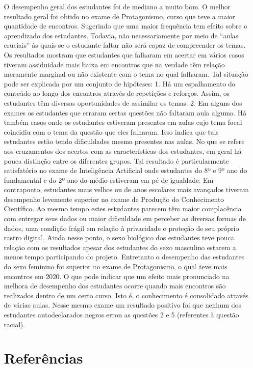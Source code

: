 \documentclass[
]{book}
\begin{document}
O desempenho geral dos estudantes foi de mediano a muito bom. O melhor resultado geral foi obtido no exame de Protagonismo, curso que teve a maior quantidade de encontros. Sugerindo que uma maior frequência tem efeito sobre o aprendizado dos estudantes. Todavia, não necessariamente por meio de ``aulas cruciais'' às quais se o estudante faltar não será capaz de compreender os temas.
Os resultados mostram que estudantes que falharam em acertar em vários casos tiveram assiduidade mais baixa em encontros que na verdade têm relação meramente marginal ou não existente com o tema no qual falharam. Tal situação pode ser explicada por um conjunto de hipóteses: 1. Há um espalhamento do conteúdo ao longo dos encontros através de repetições e reforços. Assim, os estudantes têm diversas oportunidades de assimilar os temas. 2. Em alguns dos exames os estudantes que erraram certas questões não faltaram aula alguma. Há também casos onde os estudantes estiveram presentes em aulas cujo tema focal coincidiu com o tema da questão que eles falharam. Isso indica que tais estudantes estão tendo dificuldades mesmo presentes nas aulas.
No que se refere aos cruzamentos dos acertos com as características dos estudantes, em geral há pouca distinção entre os diferentes grupos. Tal resultado é particularmente satisfatório no exame de Inteligência Artificial onde estudantes do 8º e 9º ano do fundamental e do 2º ano do médio estiveram em pé de igualdade. Em contraponto, estudantes mais velhos ou de anos escolares mais avançados tiveram desempenho levemente superior no exame de Produção do Conhecimento Científico. Ao mesmo tempo estes estudantes parecem têm maior complacência com entregar seus dados ou maior dificuldade em perceber as diversas formas de dados, uma condição frágil em relação à privacidade e proteção de seu próprio rastro digital.
Ainda nesse ponto, o sexo biológico dos estudantes teve pouca relação com os resultados apesar dos estudantes do sexo masculino estarem a menos tempo participando do projeto. Entretanto o desempenho das estudantes do sexo feminino foi superior no exame de Protagonismo, o qual teve mais encontros em 2020. O que pode indicar que um efeito mais pronunciado na melhora de desempenho dos estudantes ocorre quando mais encontros são realizados dentro de um certo curso. Isto é, o conhecimento é consolidado através de várias aulas. Nesse mesmo exame um resultado positivo foi que nenhum dos estudantes autodeclarados negros errou as questões 2 e 5 (referentes à questão racial).

\hypertarget{referuxeancias}{%
\section{Referências}\label{referuxeancias}}
\end{document}
